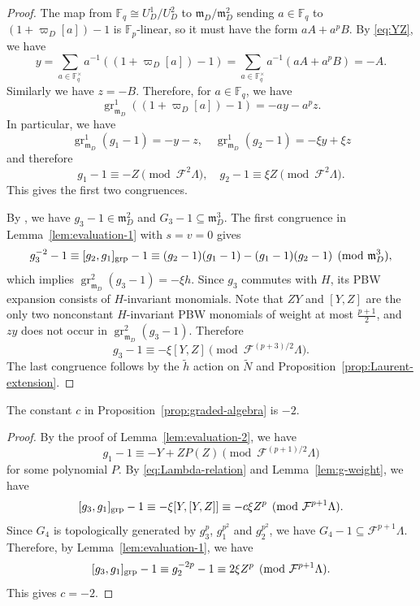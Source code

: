 \documentclass[11pt,a4paper]{article} %
\def\FF{\mathbb{F}}
\def\cF{\mathcal{F}}
\def\gr{\operatorname{gr}}
\begin{document}
\begin{proof}
    The map from $\FF_q\cong U_D^1/U_D^2$ to $\mathfrak m_D/\mathfrak m_D^2$ sending $a\in\FF_q$ to $(1+\varpi_D[a])-1$ is $\FF_p$-linear, so it must have the form $aA+a^pB$. By \eqref{eq:YZ}, we have
    \[
    y=\sum_{a\in\FF_q^\times}a^{-1}\left((1+\varpi_D[a])-1\right)=\sum_{a\in\FF_q^\times}a^{-1}(aA+a^pB)=-A.
    \]
    Similarly we have $z=-B$. Therefore, for $a\in\FF_q$, we have
    \[
    \gr_{\mathfrak m_D}^1((1+\varpi_D[a])-1)=-ay-a^pz.
    \]
    In particular, we have
    \[
    \gr_{\mathfrak m_D}^1(g_1-1)=-y-z,\quad\gr_{\mathfrak m_D}^1(g_2-1)=-\xi y+\xi z
    \]
    and therefore
    \[
    g_1-1\equiv-Z\pmod{\cF^2\Lambda},\quad g_2-1\equiv\xi Z\pmod{\cF^2\Lambda}.
    \]
    This gives the first two congruences.

    By \cite[Lemma~2.4]{HW24b}, we have $g_3-1\in\mathfrak{m}_D^2$ and $G_3-1\subseteq\mathfrak{m}_D^3$. The first congruence in Lemma~\ref{lem:evaluation-1} with $s=v=0$ gives
    \[
    g_3^{-2}-1\equiv [g_2,g_1]_{\rm grp}-1\equiv(g_2-1)(g_1-1)-(g_1-1)(g_2-1)\pmod{\mathfrak{m}_D^3},
    \]
    which implies $\gr_{\mathfrak m_D}^2(g_3-1)=-\xi h$.
    Since $g_3$ commutes with $H$, its PBW expansion consists of $H$-invariant monomials. Note that $ZY$ and $[Y,Z]$ are the only two nonconstant $H$-invariant PBW monomials of weight at most $\frac{p+1}{2}$, and $zy$ does not occur in $\gr_{\mathfrak m_D}^2(g_3-1)$. Therefore
    \[
    g_3-1\equiv-\xi[Y,Z]\pmod{\cF^{(p+3)/2}\Lambda}.
    \]
    The last congruence follows by the $\widetilde{h}$ action on $\widetilde{N}$ and Proposition~\ref{prop:Laurent-extension}.
\end{proof}

\begin{corollary}\label{cor:c}
    The constant $c$ in Proposition~\ref{prop:graded-algebra} is $-2$.
\end{corollary}

\begin{proof}
    By the proof of Lemma~\ref{lem:evaluation-2}, we have
    \[
    g_1-1\equiv-Y+ZP(Z)\pmod{\cF^{(p+1)/2}\Lambda}
    \]
    for some polynomial $P$. By \eqref{eq:Lambda-relation} and Lemma~\ref{lem:g-weight}, we have
    \[
    [g_3,g_1]_{\rm grp}-1\equiv-\xi[Y,[Y,Z]]\equiv-c\xi Z^p\pmod{\cF^{p+1}\Lambda}.
    \]
    Since $G_4$ is topologically generated by $g_3^p$, $g_1^{p^2}$ and $g_2^{p^2}$, we have $G_4-1\subseteq\cF^{p+1}\Lambda$. Therefore, by Lemma~\ref{lem:evaluation-1}, we have
    \[
    [g_3,g_1]_{\rm grp}-1\equiv g_2^{-2p}-1\equiv2\xi Z^p\pmod{\cF^{p+1}\Lambda}.
    \]
    This gives $c=-2$.
\end{proof}
\end{document}
